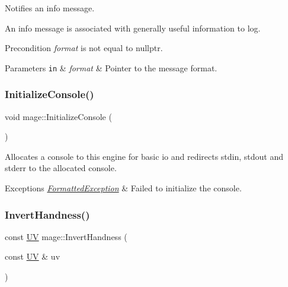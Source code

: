 Notifies an info message.

An info message is associated with generally useful information to log.

\begin{DoxyPrecond}{Precondition}
{\itshape format} is not equal to {\ttfamily nullptr}. 
\end{DoxyPrecond}

\begin{DoxyParams}[1]{Parameters}
\mbox{\tt in}  & {\em format} & Pointer to the message format. \\
\hline
\end{DoxyParams}
\hypertarget{namespacemage_a587146c8cbeed655be16ddff8435c05c}{}\label{namespacemage_a587146c8cbeed655be16ddff8435c05c} 
\subsubsection{\texorpdfstring{Initialize\+Console()}{InitializeConsole()}}
{\footnotesize\ttfamily void mage\+::\+Initialize\+Console (\begin{DoxyParamCaption}{ }\end{DoxyParamCaption})}

Allocates a console to this engine for basic io and redirects stdin, stdout and stderr to the allocated console.


\begin{DoxyExceptions}{Exceptions}
{\em \hyperlink{structmage_1_1_formatted_exception}{Formatted\+Exception}} & Failed to initialize the console. \\
\hline
\end{DoxyExceptions}
\hypertarget{namespacemage_ae12cd160f5bc01e4ef0aa2d45a80e14c}{}\label{namespacemage_ae12cd160f5bc01e4ef0aa2d45a80e14c} 
\subsubsection{\texorpdfstring{Invert\+Handness()}{InvertHandness()}\hspace{0.1cm}{\footnotesize\ttfamily [1/4]}}
{\footnotesize\ttfamily const \hyperlink{structmage_1_1_u_v}{UV} mage\+::\+Invert\+Handness (\begin{DoxyParamCaption}\item[{const \hyperlink{structmage_1_1_u_v}{UV} \&}]{uv }\end{DoxyParamCaption})}

